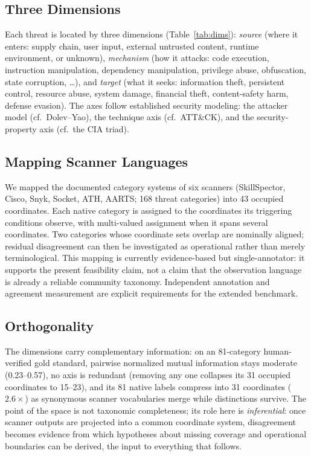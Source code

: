 \documentclass[sigconf,nonacm]{acmart}
\begin{document}
\subsection{Three Dimensions}
Each threat is located by three dimensions (Table~\ref{tab:dims}): \emph{source} (where it enters: supply chain, user input, external untrusted content, runtime environment, or unknown), \emph{mechanism} (how it attacks: code execution, instruction manipulation, dependency manipulation, privilege abuse, obfuscation, state corruption, \ldots), and \emph{target} (what it seeks: information theft, persistent control, resource abuse, system damage, financial theft, content-safety harm, defense evasion). The axes follow established security modeling: the attacker model (cf.\ Dolev--Yao), the technique axis (cf.\ ATT\&CK), and the security-property axis (cf.\ the CIA triad).

\subsection{Mapping Scanner Languages}
We mapped the documented category systems of six scanners (SkillSpector, Cisco, Snyk, Socket, ATH, AARTS; 168 threat categories) into 43 occupied coordinates. Each native category is assigned to the coordinates its triggering conditions observe, with multi-valued assignment when it spans several coordinates. Two categories whose coordinate sets overlap are nominally aligned; residual disagreement can then be investigated as operational rather than merely terminological. This mapping is currently evidence-based but single-annotator: it supports the present feasibility claim, not a claim that the observation language is already a reliable community taxonomy. Independent annotation and agreement measurement are explicit requirements for the extended benchmark.

\subsection{Orthogonality}
The dimensions carry complementary information: on an 81-category human-verified gold standard, pairwise normalized mutual information stays moderate (0.23--0.57), no axis is redundant (removing any one collapses its 31 occupied coordinates to 15--23), and its 81 native labels compress into 31 coordinates ($2.6\times$) as synonymous scanner vocabularies merge while distinctions survive. The point of the space is not taxonomic completeness; its role here is \emph{inferential}: once scanner outputs are projected into a common coordinate system, disagreement becomes evidence from which hypotheses about missing coverage and operational boundaries can be derived, the input to everything that follows.
\end{document}

